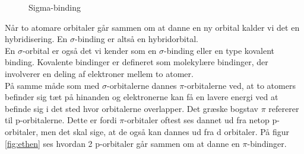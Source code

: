 \begin{center}
\begin{figure}[ht!]
  \centering
  \caption{Sigma-binding \label{fig:sigmabinding}}
   \end{figure}
	\end{center}

Når to atomare orbitaler går sammen om at danne en ny orbital kalder vi det en hybridisering. En $\sigma$-binding er altså en hybridorbital.
\\

En $\sigma$-orbital er også det vi kender som en $\sigma$-binding eller en type kovalent binding. Kovalente bindinger er defineret som molekylære bindinger, der involverer en deling af elektroner mellem to atomer.
\\

På samme måde som med $\sigma$-orbitalerne dannes $\pi$-orbitalerne ved, at to atomers befinder sig tæt på hinanden og elektronerne kan få en lavere energi ved at befinde sig i det sted hvor orbitalerne overlapper. Det græske bogstav $\pi$ refererer til p-orbitalerne. Dette er fordi $\pi$-orbitaler oftest ses dannet ud fra netop p-orbitaler, men det skal sige, at de også kan dannes ud fra d orbitaler. På figur \ref{fig:ethen} ses hvordan 2 p-orbitaler går sammen om at danne en $\pi$-bindinger. 
	
